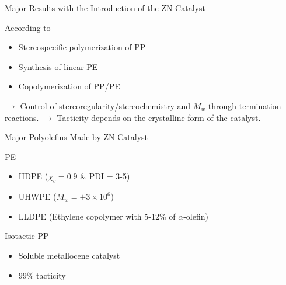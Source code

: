\begin{frame}{Major Results with the Introduction of the ZN Catalyst}
    \begin{alertblock}{According to \textcite{demoustier-champagne_lmapr2019_2024}}
        \begin{itemize}
            \item Stereospecific polymerization of PP
            \item Synthesis of linear PE
            \item Copolymerization of PP/PE
        \end{itemize}
    \end{alertblock}
    $\rightarrow$ Control of stereoregularity/stereochemistry and \( M_w \) through termination reactions. 
    $\rightarrow$ Tacticity depends on the crystalline form of the catalyst. 
\end{frame}

\begin{frame}{Major Polyolefins Made by ZN Catalyst}
    \begin{minipage}{0.45\textwidth}
        \begin{block}{PE}
            \begin{itemize}
                \item HDPE ($\chi_c = 0.9$ \& PDI = 3-5)
                \item UHWPE ($M_w = \pm 3 \times 10^6$)
                \item LLDPE (Ethylene copolymer with 5-12\% of $\alpha$-olefin)
            \end{itemize}
        \end{block}
    \end{minipage}
    \hfill
    \begin{minipage}{0.45\textwidth}
        \begin{block}{Isotactic PP}
            \begin{itemize}
                \item Soluble metallocene catalyst
                \item 99\% tacticity 
            \end{itemize}
        \end{block}
    \end{minipage}
\end{frame}

